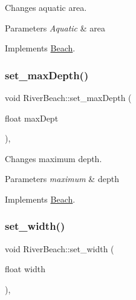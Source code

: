 Changes aquatic area. 


\begin{DoxyParams}{Parameters}
{\em Aquatic} & area \\
\hline
\end{DoxyParams}


Implements \hyperlink{class_beach_a37e71c3348356d49f3b1080973708376}{Beach}.

\mbox{\label{class_river_beach_a1118c334abeeae8352ecaf0f33059f6a}} 
\subsubsection{\texorpdfstring{set\+\_\+max\+Depth()}{set\_maxDepth()}}
{\footnotesize\ttfamily void River\+Beach\+::set\+\_\+max\+Depth (\begin{DoxyParamCaption}\item[{float}]{max\+Dept }\end{DoxyParamCaption})\hspace{0.3cm}{\ttfamily [inline]}, {\ttfamily [virtual]}}



Changes maximum depth. 


\begin{DoxyParams}{Parameters}
{\em maximum} & depth \\
\hline
\end{DoxyParams}


Implements \hyperlink{class_beach_af0226438bc6e731b2bca9f5a6078b572}{Beach}.

\mbox{\label{class_river_beach_a53697d96e65d8841e5979d3f5d79c9e3}} 
\subsubsection{\texorpdfstring{set\+\_\+width()}{set\_width()}}
{\footnotesize\ttfamily void River\+Beach\+::set\+\_\+width (\begin{DoxyParamCaption}\item[{float}]{width }\end{DoxyParamCaption})\hspace{0.3cm}{\ttfamily [inline]}, {\ttfamily [virtual]}}



